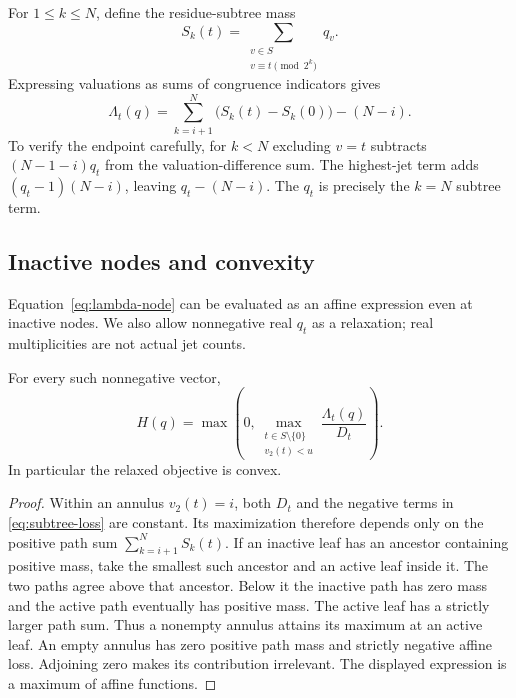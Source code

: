 For $1\le k\le N$, define the residue-subtree mass
\[
 S_k(t)=\sum_{\substack{v\in S\\v\equiv t\pmod{2^k}}}q_v.
\]
Expressing valuations as sums of congruence indicators gives
\begin{equation}\label{eq:subtree-loss}
 \Lambda_t(q)=
 \sum_{k=i+1}^{N}\bigl(S_k(t)-S_k(0)\bigr)-(N-i).
\end{equation}
To verify the endpoint carefully, for $k<N$ excluding $v=t$
subtracts $(N-1-i)q_t$ from the valuation-difference sum.
The highest-jet term adds $(q_t-1)(N-i)$, leaving
$q_t-(N-i)$. The $q_t$ is precisely the $k=N$ subtree term.

\subsection{Inactive nodes and convexity}

Equation~\eqref{eq:lambda-node} can be evaluated as an affine expression
even at inactive nodes. We also allow nonnegative real $q_t$ as a
relaxation; real multiplicities are not actual jet counts.

\begin{lemma}\label{lem:inactive}
For every such nonnegative vector,
\[
 H(q)=
 \max\left(0,\max_{\substack{t\in S\setminus\{0\}\\v_2(t)<u}}
                    \frac{\Lambda_t(q)}{D_t}\right).
\]
In particular the relaxed objective is convex.
\end{lemma}
\begin{proof}
Within an annulus $v_2(t)=i$, both $D_t$ and the negative terms in
\eqref{eq:subtree-loss} are constant. Its maximization therefore depends
only on the positive path sum $\sum_{k=i+1}^NS_k(t)$.
If an inactive leaf has an ancestor containing positive mass, take
the smallest such ancestor and an active leaf inside it. The two
paths agree above that ancestor. Below it the inactive path has
zero mass and the active path eventually has positive mass.
The active leaf has a strictly larger path sum.
Thus a nonempty annulus attains its maximum at an active leaf.
An empty annulus has zero positive path mass and strictly negative
affine loss. Adjoining zero makes its contribution irrelevant.
The displayed expression is a maximum of affine functions.
\end{proof}

